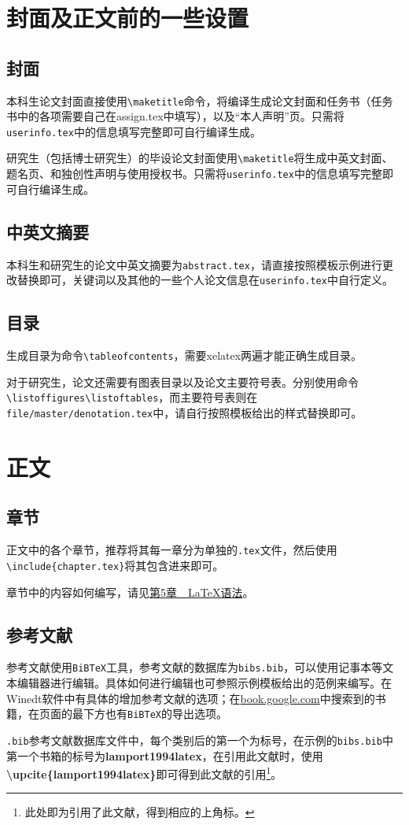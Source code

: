     \section{封面及正文前的一些设置}
        \subsection{封面}
            本科生论文封面直接使用\texttt{\textbackslash maketitle}命令，将编译生成论文封面和任务书（任务书中的各项需要自己在assign.tex中填写），以及“本人声明”页。只需将\texttt{userinfo.tex}中的信息填写完整即可自行编译生成。\par
            研究生（包括博士研究生）的毕设论文封面使用\texttt{\textbackslash maketitle}将生成中英文封面、题名页、和独创性声明与使用授权书。只需将\texttt{userinfo.tex}中的信息填写完整即可自行编译生成。
        \subsection{中英文摘要}
            本科生和研究生的论文中英文摘要为\texttt{abstract.tex}，请直接按照模板示例进行更改替换即可，关键词以及其他的一些个人论文信息在\texttt{userinfo.tex}中自行定义。
        \subsection{目录}
            生成目录为命令\texttt{\textbackslash tableofcontents}，需要xelatex两遍才能正确生成目录。\par
            对于研究生，论文还需要有图表目录以及论文主要符号表。分别使用命令\texttt{\textbackslash listoffigures}\texttt{\textbackslash listoftables}，而主要符号表则在\texttt{file/master/denotation.tex}中，请自行按照模板给出的样式替换即可。
    \section{正文}
        \subsection{章节}
            正文中的各个章节，推荐将其每一章分为单独的\texttt{.tex}文件，然后使用\texttt{\textbackslash include\{chapter.tex\}}将其包含进来即可。\par
            章节中的内容如何编写，请见\hyperref[chapter-yufa]{第5章~~\LaTeX{}语法}。
        \subsection{参考文献}
            参考文献使用\texttt{BiBTeX}工具，参考文献的数据库为\texttt{bibs.bib}，可以使用记事本等文本编辑器进行编辑。具体如何进行编辑也可参照示例模板给出的范例来编写。在Winedt软件中有具体的增加参考文献的选项；在\url{book.google.com}中搜索到的书籍，在页面的最下方也有\texttt{BiBTeX}的导出选项。\par
            \texttt{.bib}参考文献数据库文件中，每个类别后的第一个为标号，在示例的\texttt{bibs.bib}中第一个书箱的标号为\textbf{lamport1994latex}，在引用此文献时，使用\textbf{\textbackslash upcite\{lamport1994latex\}}即可得到此文献的引用\footnote{此处即为引用了此文献，得到相应的上角标。}。
